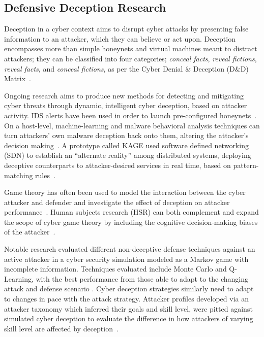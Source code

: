 \documentclass{article}
\begin{document}
\subsection{Defensive Deception Research}

Deception in a cyber context aims to disrupt cyber attacks by presenting false information to an attacker, which they can believe or act upon. Deception encompasses more than simple honeynets and virtual machines meant to distract attackers; they can be classified into four categories; \textit{conceal facts}, \textit{reveal fictions}, \textit{reveal facts}, and \textit{conceal fictions}, as per the Cyber Denial \& Deception (D\&D) Matrix~\cite{heckman_cyber_2015}.

Ongoing research aims to produce new methods for detecting and mitigating cyber threats through dynamic, intelligent cyber deception, based on attacker activity. IDS alerts have been used in order to launch pre-configured honeynets~\cite{acosta2020}.
On a host-level, machine-learning and malware behavioral analysis techniques can turn attackers' own malware deception back onto them, altering the attacker's decision making~\cite{sajidul2020}. A prototype called KAGE used software defined networking (SDN) to establish an ``alternate reality'' among distributed systems, deploying deceptive counterparts to attacker-desired services in real time, based on pattern-matching rules~\cite{soule2016}. 

Game theory has often been used to model the interaction between the cyber attacker and defender and investigate the effect of deception on attacker performance~\cite{ferguson-walter_gamesec_2019}\cite{carroll2009}\cite{feng2017}\cite{kovach2015}. Human subjects research (HSR) can both complement and expand the scope of cyber game theory by including the cognitive decision-making biases of the attacker~\cite{gutzwiller2019}\cite{johnson2020}. 

Notable research evaluated different non-deceptive defense techniques against an active attacker in a cyber security simulation modeled as a Markov game with incomplete information. Techniques evaluated include Monte Carlo and Q-Learning, with the best performance from those able to adapt to the changing attack and defense scenario \cite{elderman2017}. Cyber deception strategies similarly need to adapt to changes in pace with the attack strategy. Attacker profiles developed via an attacker taxonomy which inferred their goals and skill level, were pitted against simulated cyber deception to evaluate the difference in how attackers of varying skill level are affected by deception~\cite{8328465}. 
\end{document}
